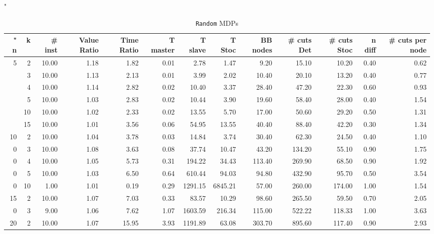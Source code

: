 \begin{sidewaystable} %
				
"\begin{tabular}{rrrrrrrrrrrrr}																"																										
n	&	k	&	\# inst	&	Value Ratio	&	Time Ratio	&	T master	&	T slave	&	T Stoc	&	BB nodes	&	\# cuts Det	&	\# cuts Stoc	&	n diff	&	\# cuts per node	\\	\hline
5	&	2	&	10.00	&	1.18	&	1.82	&	0.01	&	2.78	&	1.47	&	9.20	&	15.10	&	10.20	&	0.40	&	0.62	\\	
	&	3	&	10.00	&	1.13	&	2.13	&	0.01	&	3.99	&	2.02	&	10.40	&	20.10	&	13.20	&	0.40	&	0.77	\\	
	&	4	&	10.00	&	1.14	&	2.82	&	0.02	&	10.40	&	3.37	&	28.40	&	47.20	&	22.30	&	0.60	&	0.93	\\	
	&	5	&	10.00	&	1.03	&	2.83	&	0.02	&	10.44	&	3.90	&	19.60	&	58.40	&	28.00	&	0.40	&	1.54	\\	
	&	10	&	10.00	&	1.02	&	2.33	&	0.02	&	13.55	&	5.70	&	17.00	&	50.60	&	29.20	&	0.50	&	1.31	\\	
	&	15	&	10.00	&	1.01	&	3.56	&	0.06	&	54.95	&	13.55	&	40.40	&	88.40	&	42.20	&	0.30	&	1.34	\\	\hline
10	&	2	&	10.00	&	1.04	&	3.78	&	0.03	&	14.84	&	3.74	&	30.40	&	62.30	&	24.50	&	0.40	&	1.10	\\	
0	&	3	&	10.00	&	1.08	&	3.63	&	0.08	&	37.74	&	10.47	&	43.20	&	134.20	&	55.10	&	0.90	&	1.75	\\	
0	&	4	&	10.00	&	1.05	&	5.73	&	0.31	&	194.22	&	34.43	&	113.40	&	269.90	&	68.50	&	0.90	&	1.92	\\	
0	&	5	&	10.00	&	1.03	&	6.50	&	0.64	&	610.44	&	94.03	&	94.80	&	432.90	&	95.70	&	0.50	&	3.54	\\	
0	&	10	&	1.00	&	1.01	&	0.19	&	0.29	&	1291.15	&	6845.21	&	57.00	&	260.00	&	174.00	&	1.00	&	1.54	\\	\hline
15	&	2	&	10.00	&	1.07	&	7.03	&	0.33	&	83.57	&	10.29	&	98.60	&	265.50	&	59.50	&	0.70	&	2.05	\\	
0	&	3	&	9.00	&	1.06	&	7.62	&	1.07	&	1603.59	&	216.34	&	115.00	&	522.22	&	118.33	&	1.00	&	3.63	\\	
20	&	2	&	10.00	&	1.07	&	15.95	&	3.93	&	1191.89	&	63.08	&	303.70	&	895.60	&	117.40	&	0.90	&	2.93	\\	
\end{tabular}																									\label{tab:random}
\caption{\texttt{Random} MDPs}	
\end{sidewaystable} %
